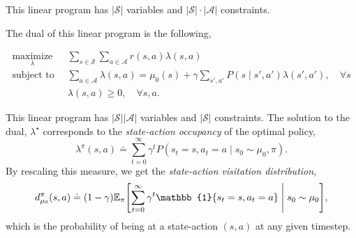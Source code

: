 This linear program has $|\mathcal{S}|$ variables and $|\mathcal{S}| \cdot |\mathcal{A}|$
constraints.

The dual of this linear program is the following,

\begin{important}
    \begin{align*}
        \underset{\lambda}{\text{maximize}} \;\; & \sum_{s\in \mathcal{S}} \sum_{a\in \mathcal{A}} r(s,a) \lambda(s,a)                                                  \\
        \text{subject to} \;\;                   & \sum_{a\in \mathcal{A}} \lambda(s,a) = \mu_0(s) + \gamma \sum_{s',a'} P(s\mid s',a') \lambda(s',a'), \quad \forall s \\
                                                 & \lambda(s,a) \geq 0, \quad \forall s, a.
    \end{align*}
\end{important}

This linear program has $|\mathcal{S}| |\mathcal{A}|$ variables and $|\mathcal{S}|$ constraints.
The solution to the dual, $\lambda^\star$ corresponds to the \textit{state-action occupancy} of the
optimal policy, \[
    \lambda^\pi(s,a) \doteq \sum_{t=0}^{\infty} \gamma^t P(s_t=s, a_t=a \mid s_0 \sim \mu_0, \pi).
\]
By rescaling this measure, we get the \textit{state-action visitation distribution}, \[
    d_{\mu_0}^\pi(s,a) \doteq (1-\gamma) \E_\pi \lft[ \sum_{t=0}^{\infty} \gamma^t \mathbb{1}\{ s_t = s, a_t = a \} \;\middle|\; s_0 \sim \mu_0 \rgt],
\]
which is the probability of being at a state-action $(s,a)$ at any given timestep.

